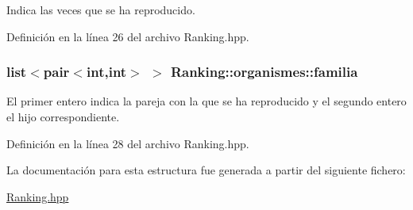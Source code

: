 Indica las veces que se ha reproducido. 



Definición en la línea 26 del archivo Ranking.\-hpp.

\hypertarget{struct_ranking_1_1organismes_ae1bb9f71e85134a2f63f0d4ed50ea6e6}{
\subsubsection[{familia}]{\setlength{\rightskip}{0pt plus 5cm}list$<$pair$<$int,int$>$ $>$ Ranking\-::organismes\-::familia}}\label{struct_ranking_1_1organismes_ae1bb9f71e85134a2f63f0d4ed50ea6e6}


El primer entero indica la pareja con la que se ha reproducido y el segundo entero el hijo correspondiente. 



Definición en la línea 28 del archivo Ranking.\-hpp.



La documentación para esta estructura fue generada a partir del siguiente fichero\-:\begin{DoxyCompactItemize}
\item 
\hyperlink{_ranking_8hpp}{Ranking.\-hpp}\end{DoxyCompactItemize}
